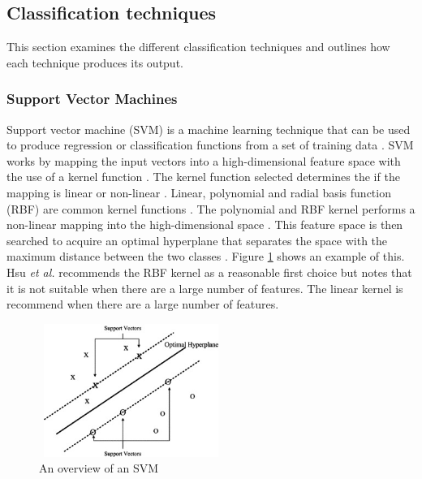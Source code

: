 \documentclass{sig-alternate-05-2015}
\begin{document}
	\subsection{Classification techniques}
	This section examines the different classification techniques and outlines how each technique produces its output.
	\subsubsection{Support Vector Machines}
	Support vector machine (SVM) is a machine learning technique that can be used to produce regression or classification functions from a set of training data \cite{Luo20097562}. SVM works by mapping the input vectors into a high-dimensional feature space with the use of a kernel function \cite{Danenas20153194}. The kernel function selected determines the if the mapping is linear or non-linear \cite{Luo20097562}. Linear, polynomial and radial basis function (RBF) are common kernel functions \cite{hsu2003practical}. The polynomial and RBF kernel performs a non-linear mapping into the high-dimensional space \cite{hsu2003practical}. This feature space is then searched to acquire an optimal hyperplane that separates the space with the maximum distance between the two classes \cite{Danenas20153194}. Figure \ref{fig:svm-overview} shows an example of this. Hsu \textit{et al.} \cite{hsu2003practical} recommends the RBF kernel as a reasonable first choice but notes that it is not suitable when there are a large number of features. The linear kernel is recommend when there are a large number of features.
	
	\begin{figure}
		\centering
		\includegraphics[height=4.34cm, width=6cm]{SVM}
		\caption{An overview  of an SVM \cite{Li2006772}}
		\label{fig:svm-overview}
	\end{figure}
	
\end{document}
